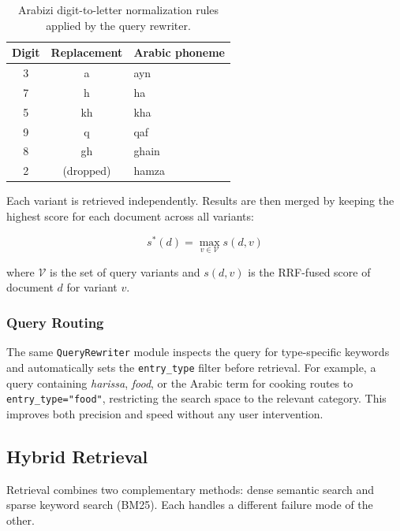 \begin{table}[htbp]
\centering
\begin{tabular}{@{} c c l @{}}
\toprule
\textbf{Digit} & \textbf{Replacement} & \textbf{Arabic phoneme} \\
\midrule
3 & a        & ayn \\
7 & h        & ha \\
5 & kh       & kha \\
9 & q        & qaf \\
8 & gh       & ghain \\
2 & (dropped) & hamza \\
\bottomrule
\end{tabular}
\caption{Arabizi digit-to-letter normalization rules applied by the query rewriter.}
\label{tab:arabizi}
\end{table}

Each variant is retrieved independently. Results are then merged by keeping the
highest score for each document across all variants:

\begin{equation}
    s^*(d) = \max_{v \in \mathcal{V}} s(d, v)
    \label{eq:multiquery_merge}
\end{equation}

\noindent where $\mathcal{V}$ is the set of query variants and $s(d,v)$ is the
RRF-fused score of document $d$ for variant $v$.

\subsubsection{Query Routing}

The same \texttt{QueryRewriter} module inspects the query for type-specific keywords
and automatically sets the \texttt{entry\_type} filter before retrieval. For example,
a query containing \textit{harissa}, \textit{food}, or the Arabic term for cooking
routes to \texttt{entry\_type="food"}, restricting the search space to the relevant
category. This improves both precision and speed without any user intervention.

\subsection{Hybrid Retrieval}
\label{subsec:retrieval}

Retrieval combines two complementary methods: dense semantic search and sparse
keyword search (BM25). Each handles a different failure mode of the other.

